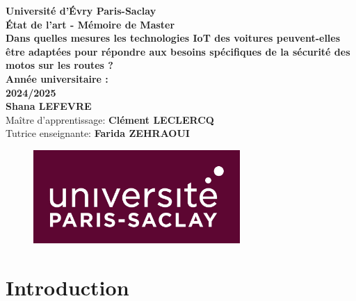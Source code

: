 \documentclass{article}
\begin{document}
\begin{titlepage}
    \begin{center}
        {\Large \textbf{Université d'Évry Paris-Saclay}}\\[0.5cm]
        {\huge \textbf{État de l'art - Mémoire de Master}}\\[3cm]
        {\huge \textbf{Dans quelles mesures les technologies IoT des voitures peuvent-elles être adaptées pour répondre aux besoins spécifiques de la sécurité des motos sur les routes ? }}\\[1cm]
        \textbf{Année universitaire :} \\[0.5cm]
        {\Large \textbf{2024/2025}}\\[1cm]
                {\Large \textbf{Shana LEFEVRE}}\\[2cm]
                {\Large Maître d'apprentissage: \textbf{Clément LECLERCQ}}\\[0.5cm]
                {\Large Tutrice enseignante: \textbf{Farida ZEHRAOUI}}\\[2cm]
                \begin{figure}[h]
    \centering
    \includegraphics[width=0.7\textwidth]{images/logo_paris_saclay.png} 
\end{figure}
    \end{center}
\end{titlepage}

\tableofcontents %
\newpage

\newpage
\section{Introduction}
\end{document}
